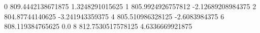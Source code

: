 0 809.4442138671875 1.3248291015625
1 805.9924926757812 -2.12689208984375
2 804.87744140625 -3.241943359375
4 805.510986328125 -2.6083984375
6 808.119384765625 0.0
8 812.7530517578125 4.6336669921875
